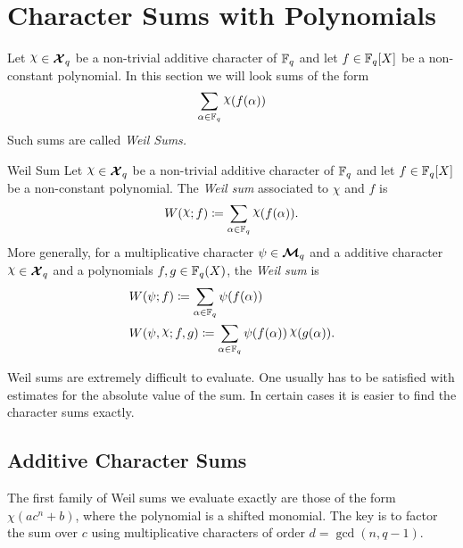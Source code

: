 \section{Character Sums with Polynomials}\label{sec:character-sum-poly}
Let $\chi\in\Xq$ be a non-trivial additive character of $\mathbb{F}_q$ and let $f\in\mathbb{F}_q[X]$ be a non-constant polynomial. In this section we will look sums of the form $$\sum_{\alpha\in\bbF_q}\chi(f(\alpha))$$Such sums are called \emph{Weil Sums.}
\begin{Definition}{Weil Sum}{}
  Let $\chi\in\Xq$ be a non-trivial additive character of $\mathbb{F}_q$ and let $f\in\mathbb{F}_q[X]$ be a non-constant polynomial. The \emph{Weil sum} associated to $\chi$ and $f$ is
  $$W(\chi;f)\coloneqq\sum_{\alpha\in\bbF_q}\chi(f(\alpha)).$$
  More generally, for a multiplicative character $\psi\in\boldsymbol{\mathcal{M}}_q$ and a additive character $\chi\in\Xq$ and a polynomials $f,g\in\mathbb{F}_q(X)$, the \emph{Weil sum} is
  \begin{align*}
    & W(\psi;f)\coloneqq\sum_{\alpha\in\bbF_q}\psi(f(\alpha))\\ 
    & W(\psi,\chi;f,g)\coloneqq\sum_{\alpha\in\bbF_q}\psi(f(\alpha))\,\chi(g(\alpha)).
  \end{align*}
\end{Definition}Weil sums are extremely difficult to evaluate. One usually has to be satisfied with estimates for the absolute value of the sum. In certain cases it is easier to find the character sums exactly. 

\subsection{Additive Character Sums}
%

The first family of Weil sums we evaluate exactly are those of the form $\chi(ac^n+b)$, where the polynomial is a shifted monomial. The key is to factor the sum over $c$ using multiplicative characters of order $d=\gcd(n,q-1)$.

